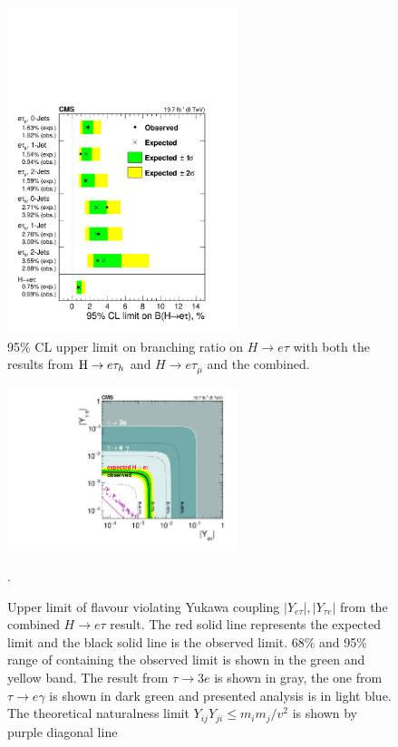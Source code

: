\begin{figure}[htpb]
\begin{center}
\includegraphics[width=0.6\textwidth]{chapter8/HEtau_summary.pdf}
\end{center}
\caption{95\% CL upper limit on branching ratio on $H \to e \tau$ with both the results from $\mathrm{H} \to e \tau_{h}$ and $H \to e \tau_{\mu}$ and the combined. }

\label{fig:Etaulimitsummary}
\end{figure}


\begin{figure}[htpb]
\begin{center}
\includegraphics[width=0.6\textwidth]{chapter8/EtauYukawa.pdf}\label{fig:etauYukawa}
\end{center}

\caption{Upper limit of flavour violating Yukawa coupling $|Y_{e\tau}|, |Y_{\tau e}|$ from the combined $H \to e \tau$ result. The red solid line represents the expected limit and the black solid line is the observed limit. 68\% and 95\% range of containing the observed limit is shown in the green and yellow band. The result from $\tau \to 3e$ is shown in gray, the one from $\tau \to e\gamma$ is shown in dark green and presented analysis is in light blue. The theoretical naturalness limit $Y_{ij}Y_{ji} \leq m_im_j/v^2$ is shown by purple diagonal line~\cite{Harnik:2012pb}}.
\label{fig:etauYukawas}
\end{figure}




